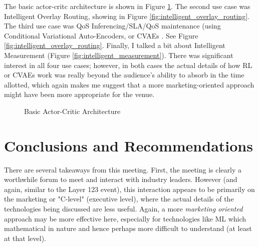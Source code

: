 \documentclass[11pt, oneside]{article}   	%
\begin{document}
\bigskip
\noindent
The basic actor-critc architecture is shown in Figure \ref{fig:ac_architecture}. The second use case was Intelligent Overlay Routing, showing in Figure \ref{fig:intelligent_overlay_routing}.
The third use case was QoS Inferencing/SLA/QoS maintenance (using Conditional Variational Auto-Encoders, or CVAEs \cite{NIPS2015_5775}. 
See Figure \ref{fig:intelligent_overlay_routing}. Finally, I talked a bit about  Intelligent Measurement (Figure \ref{fig:intelligent_measurement}). There was significant interest in 
all four use cases; however, in both cases the actual details of how 
RL or CVAEs work was  really beyond the audience's ability to absorb in the time allotted, which again makes me suggest that a more marketing-oriented approach might have 
been more appropriate for the venue. 

\begin{figure}
\caption{Basic Actor-Critic Architecture}
\label{fig:ac_architecture}
\end{figure}



\section{Conclusions and Recommendations} 
\label{sec:conclusions}
There are several takeaways from this meeting. First, the meeting is clearly a worthwhile forum to meet and interact with industry leaders. However (and again, similar to the Layer 123 event),
this interaction appears to be primarily on the marketing or "C-level" (executive level), where the actual details of the technologies being discussed are less useful. Again, a more \emph{marketing oriented} approach may be more effective here, especially for technologies like ML which mathematical in nature and hence perhaps more difficult to understand (at least at that level). 
\end{document}
